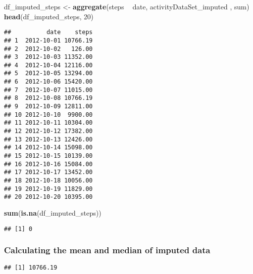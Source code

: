\documentclass[
]{article}
\newenvironment{Shaded}{\begin{snugshade}}{\end{snugshade}}
\newcommand{\DecValTok}[1]{\textcolor[rgb]{0.00,0.00,0.81}{#1}}
\newcommand{\KeywordTok}[1]{\textcolor[rgb]{0.13,0.29,0.53}{\textbf{#1}}}
\newcommand{\NormalTok}[1]{#1}
\newcommand{\OperatorTok}[1]{\textcolor[rgb]{0.81,0.36,0.00}{\textbf{#1}}}
\newcommand{\StringTok}[1]{\textcolor[rgb]{0.31,0.60,0.02}{#1}}
\begin{document}
\begin{Shaded}
\begin{Highlighting}[]
\NormalTok{df_imputed_steps <-}\StringTok{ }\KeywordTok{aggregate}\NormalTok{(steps }\OperatorTok{~}\StringTok{ }\NormalTok{date, activityDataSet_imputed , sum)}
\KeywordTok{head}\NormalTok{(df_imputed_steps, }\DecValTok{20}\NormalTok{)}
\end{Highlighting}
\end{Shaded}

\begin{verbatim}
##          date    steps
## 1  2012-10-01 10766.19
## 2  2012-10-02   126.00
## 3  2012-10-03 11352.00
## 4  2012-10-04 12116.00
## 5  2012-10-05 13294.00
## 6  2012-10-06 15420.00
## 7  2012-10-07 11015.00
## 8  2012-10-08 10766.19
## 9  2012-10-09 12811.00
## 10 2012-10-10  9900.00
## 11 2012-10-11 10304.00
## 12 2012-10-12 17382.00
## 13 2012-10-13 12426.00
## 14 2012-10-14 15098.00
## 15 2012-10-15 10139.00
## 16 2012-10-16 15084.00
## 17 2012-10-17 13452.00
## 18 2012-10-18 10056.00
## 19 2012-10-19 11829.00
## 20 2012-10-20 10395.00
\end{verbatim}

\begin{Shaded}
\begin{Highlighting}[]
\KeywordTok{sum}\NormalTok{(}\KeywordTok{is.na}\NormalTok{(df_imputed_steps))}
\end{Highlighting}
\end{Shaded}

\begin{verbatim}
## [1] 0
\end{verbatim}

\hypertarget{calculating-the-mean-and-median-of-imputed-data}{%
\subsubsection{Calculating the mean and median of imputed
data}\label{calculating-the-mean-and-median-of-imputed-data}}

\begin{Shaded}
\end{Shaded}

\begin{verbatim}
## [1] 10766.19
\end{verbatim}
\end{document}
